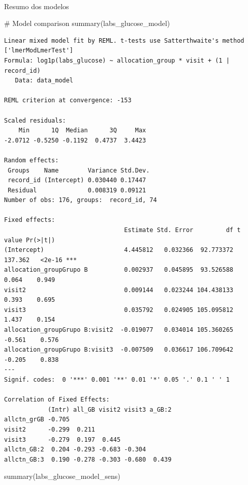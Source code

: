 \documentclass[
  12pt,
]{article}
\makeatletter
\let\oldparagraph\paragraph
\renewcommand{\paragraph}{
    \@ifstar
      \xxxParagraphStar
      \xxxParagraphNoStar
  }
\newcommand{\xxxParagraphStar}[1]{\oldparagraph*{#1}\mbox{}}
\newcommand{\xxxParagraphNoStar}[1]{\oldparagraph{#1}\mbox{}}
\newenvironment{Shaded}{\begin{snugshade}}{\end{snugshade}}
\newcommand{\CommentTok}[1]{\textcolor[rgb]{0.37,0.37,0.37}{#1}}
\newcommand{\FunctionTok}[1]{\textcolor[rgb]{0.28,0.35,0.67}{#1}}
\newcommand{\NormalTok}[1]{\textcolor[rgb]{0.00,0.23,0.31}{#1}}
\makeatother
\begin{document}
\paragraph{Resumo dos modelos}\label{resumo-dos-modelos-8}

\begin{Shaded}
\begin{Highlighting}[]
\CommentTok{\# Model comparison}
\FunctionTok{summary}\NormalTok{(labs\_glucose\_model)}
\end{Highlighting}
\end{Shaded}

\begin{verbatim}
Linear mixed model fit by REML. t-tests use Satterthwaite's method ['lmerModLmerTest']
Formula: log1p(labs_glucose) ~ allocation_group * visit + (1 | record_id)
   Data: data_model

REML criterion at convergence: -153

Scaled residuals: 
    Min      1Q  Median      3Q     Max 
-2.0712 -0.5250 -0.1192  0.4737  3.4423 

Random effects:
 Groups    Name        Variance Std.Dev.
 record_id (Intercept) 0.030440 0.17447 
 Residual              0.008319 0.09121 
Number of obs: 176, groups:  record_id, 74

Fixed effects:
                                 Estimate Std. Error         df t value Pr(>|t|)    
(Intercept)                      4.445812   0.032366  92.773372 137.362   <2e-16 ***
allocation_groupGrupo B          0.002937   0.045895  93.526588   0.064    0.949    
visit2                           0.009144   0.023244 104.438133   0.393    0.695    
visit3                           0.035792   0.024905 105.095812   1.437    0.154    
allocation_groupGrupo B:visit2  -0.019077   0.034014 105.360265  -0.561    0.576    
allocation_groupGrupo B:visit3  -0.007509   0.036617 106.709642  -0.205    0.838    
---
Signif. codes:  0 '***' 0.001 '**' 0.01 '*' 0.05 '.' 0.1 ' ' 1

Correlation of Fixed Effects:
            (Intr) all_GB visit2 visit3 a_GB:2
allctn_grGB -0.705                            
visit2      -0.299  0.211                     
visit3      -0.279  0.197  0.445              
allctn_GB:2  0.204 -0.293 -0.683 -0.304       
allctn_GB:3  0.190 -0.278 -0.303 -0.680  0.439
\end{verbatim}

\begin{Shaded}
\begin{Highlighting}[]
\FunctionTok{summary}\NormalTok{(labs\_glucose\_model\_sens)}
\end{Highlighting}
\end{Shaded}
\end{document}
